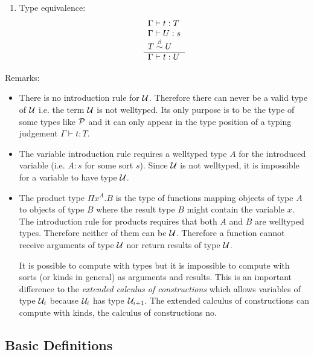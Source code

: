 \begin{definition}
\begin{enumerate}
\begin{enumerate}
            \item Type equivalence:
                $$
                \begin{array}{l} 
                    \Gamma \vdash t: T
                    \\
                    \Gamma \vdash U: s
                    \\
                    T \stackrel{\beta}{\sim} U
                 \\ \hline 
                    \Gamma \vdash t: U
                \end{array}
                $$

        \end{enumerate}
    \end{enumerate}
\end{definition}


Remarks:
\begin{itemize}
    \item There is no introduction rule for ${\cal U}$. Therefore there can never be
        a valid type of ${\cal U}$ i.e. the term ${\cal U}$ is not welltyped. Its only
        purpose is to be the type of some types like ${\cal P}$ and it can only
        appear in the type position of a typing judgement $\Gamma \vdash t : T$.

    \item The variable introduction rule requires a welltyped type $A$ for the
        introduced variable (i.e. $A: s$ for some sort $s$). Since ${\cal U}$ is not
        welltyped, it is impossible for a variable to have type ${\cal U}$.

    \item The product type $\Pi x^A. B$ is the type of functions mapping objects
        of type $A$ to objects of type $B$ where the result type $B$ might
        contain the variable $x$. The introduction rule for products requires
        that both $A$ and $B$ are welltyped types. Therefore neither of them can
        be ${\cal U}$. Therefore a function cannot receive arguments of type ${\cal U}$
        nor return results of type ${\cal U}$.

        It is possible to compute with types but it is impossible to compute
        with sorts (or kinds in general) as arguments and results. This is an
        important difference to the \emph{extended calculus of constructions}
        which allows variables of type ${\cal U}_i$ because ${\cal U}_i$ has type
        ${\cal U}_{i+1}$. The extended calculus of constructions can compute with
        kinds, the calculus of constructions no.
\end{itemize}



\subsection{Basic Definitions}

